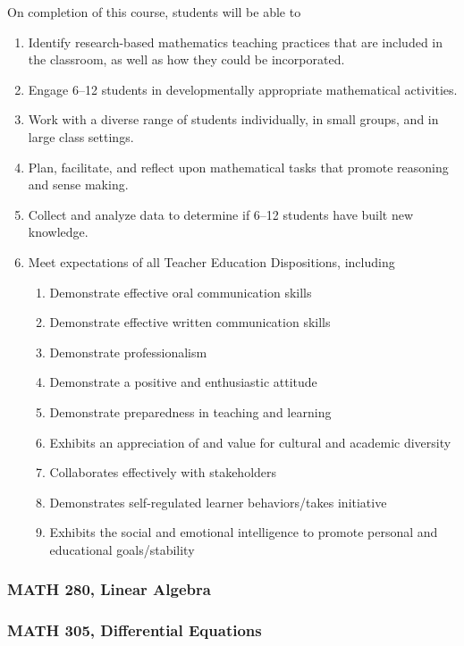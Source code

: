 \documentclass[10pt]{article}
\newenvironment{alphalist}{
\begin{enumerate}[label=(\arabic*),widest=107 ,leftmargin=25pt, itemsep=0pt]}
{\end{enumerate}}
\newenvironment{betalist}{
\begin{enumerate}[label=(\alph*),widest=zzz,leftmargin=25pt,itemsep=0pt]}
{\end{enumerate}}
\begin{document}
On completion of this course, students will be able to
\begin{alphalist}
\item Identify research-based mathematics teaching practices that are included in the classroom, as well as how they could be incorporated.
\item Engage 6--12 students in developmentally appropriate mathematical activities. 
\item Work with a diverse range of students individually, in small groups, and in large class settings.
\item Plan, facilitate, and reflect upon mathematical tasks that promote reasoning and sense making.
\item Collect and analyze data to determine if 6--12 students have built new knowledge.
\item Meet expectations of all Teacher Education Dispositions, including
\begin{betalist}
    \item Demonstrate effective oral communication skills
    \item Demonstrate effective written communication skills
    \item Demonstrate professionalism
    \item Demonstrate a positive and enthusiastic attitude
    \item Demonstrate preparedness in teaching and learning
    \item Exhibits an appreciation of and value for cultural and academic diversity
    \item Collaborates effectively with stakeholders
    \item Demonstrates self-regulated learner behaviors/takes initiative
    \item Exhibits the social and emotional intelligence to promote personal and educational goals/stability
\end{betalist}
\end{alphalist}

\subsubsection*{MATH 280, Linear Algebra}



\subsubsection*{MATH 305, Differential Equations}
\end{document}
